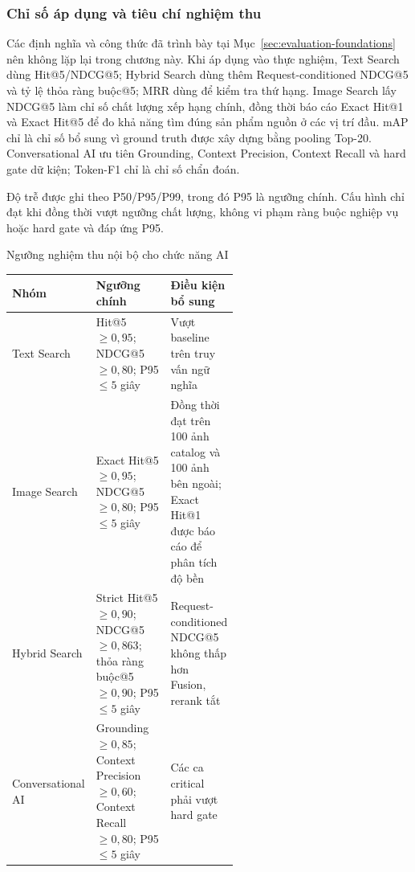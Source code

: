 \subsubsection{Chỉ số áp dụng và tiêu chí nghiệm thu}

Các định nghĩa và công thức đã trình bày tại Mục~\ref{sec:evaluation-foundations} nên không lặp lại trong chương này. Khi áp dụng vào thực nghiệm, Text Search dùng Hit@5/NDCG@5; Hybrid Search dùng thêm Request-conditioned NDCG@5 và tỷ lệ thỏa ràng buộc@5; MRR dùng để kiểm tra thứ hạng. Image Search lấy NDCG@5 làm chỉ số chất lượng xếp hạng chính, đồng thời báo cáo Exact Hit@1 và Exact Hit@5 để đo khả năng tìm đúng sản phẩm nguồn ở các vị trí đầu. mAP chỉ là chỉ số bổ sung vì ground truth được xây dựng bằng pooling Top-20. Conversational AI ưu tiên Grounding, Context Precision, Context Recall và hard gate dữ kiện; Token-F1 chỉ là chỉ số chẩn đoán.

Độ trễ được ghi theo P50/P95/P99, trong đó P95 là ngưỡng chính. Cấu hình chỉ đạt khi đồng thời vượt ngưỡng chất lượng, không vi phạm ràng buộc nghiệp vụ hoặc hard gate và đáp ứng P95.

\begin{breakabletable}
\centering
\caption{Ngưỡng nghiệm thu nội bộ cho chức năng AI}
\label{tab:ai-acceptance-gates}
\small
\begin{tabularx}{\linewidth}{|p{0.18\linewidth}|p{0.38\linewidth}|X|}
\hline
\textbf{Nhóm} & \textbf{Ngưỡng chính} & \textbf{Điều kiện bổ sung} \\ \hline
Text Search & Hit@5 $\geq 0{,}95$; NDCG@5 $\geq 0{,}80$; P95 $\leq 5$ giây & Vượt baseline trên truy vấn ngữ nghĩa \\ \hline
Image Search & Exact Hit@5 $\geq 0{,}95$; NDCG@5 $\geq 0{,}80$; P95 $\leq 5$ giây & Đồng thời đạt trên 100 ảnh catalog và 100 ảnh bên ngoài; Exact Hit@1 được báo cáo để phân tích độ bền \\ \hline
Hybrid Search & Strict Hit@5 $\geq 0{,}90$; NDCG@5 $\geq 0{,}863$; thỏa ràng buộc@5 $\geq 0{,}90$; P95 $\leq 5$ giây & Request-conditioned NDCG@5 không thấp hơn Fusion, rerank tắt \\ \hline
\makecell[l]{Conversational\\AI} & Grounding $\geq 0{,}85$; Context Precision $\geq 0{,}60$; Context Recall $\geq 0{,}80$; P95 $\leq 5$ giây & Các ca critical phải vượt hard gate \\ \hline
\end{tabularx}
\end{breakabletable}

